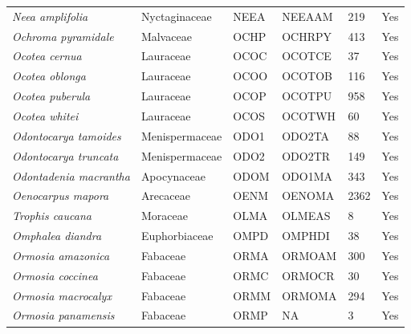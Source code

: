 \documentclass[11pt]{article}
\begin{document}
\begin{longtable}{@{}llllll@{}}
\textit{Neea amplifolia}                              & Nyctaginaceae    & NEEA   & NEEAAM & 219             & Yes       \\
\textit{Ochroma pyramidale}                           & Malvaceae        & OCHP   & OCHRPY & 413             & Yes       \\
\textit{Ocotea cernua}                                & Lauraceae        & OCOC   & OCOTCE & 37              & Yes       \\
\textit{Ocotea oblonga}                               & Lauraceae        & OCOO   & OCOTOB & 116             & Yes       \\
\textit{Ocotea puberula}                              & Lauraceae        & OCOP   & OCOTPU & 958             & Yes       \\
\textit{Ocotea whitei}                                & Lauraceae        & OCOS   & OCOTWH & 60              & Yes       \\
\textit{Odontocarya tamoides}                         & Menispermaceae   & ODO1   & ODO2TA & 88              & Yes       \\
\textit{Odontocarya truncata}                         & Menispermaceae   & ODO2   & ODO2TR & 149             & Yes       \\
\textit{Odontadenia macrantha}                        & Apocynaceae      & ODOM   & ODO1MA & 343             & Yes       \\
\textit{Oenocarpus mapora}                            & Arecaceae        & OENM   & OENOMA & 2362            & Yes       \\
\textit{Trophis caucana}                              & Moraceae         & OLMA   & OLMEAS & 8               & Yes       \\
\textit{Omphalea diandra}                             & Euphorbiaceae    & OMPD   & OMPHDI & 38              & Yes       \\
\textit{Ormosia amazonica}                            & Fabaceae         & ORMA   & ORMOAM & 300             & Yes       \\
\textit{Ormosia coccinea}                             & Fabaceae         & ORMC   & ORMOCR & 30              & Yes       \\
\textit{Ormosia macrocalyx}                           & Fabaceae         & ORMM   & ORMOMA & 294             & Yes       \\
\textit{Ormosia panamensis}                           & Fabaceae         & ORMP   & NA     & 3               & Yes       \\

\end{longtable}
\end{document}
